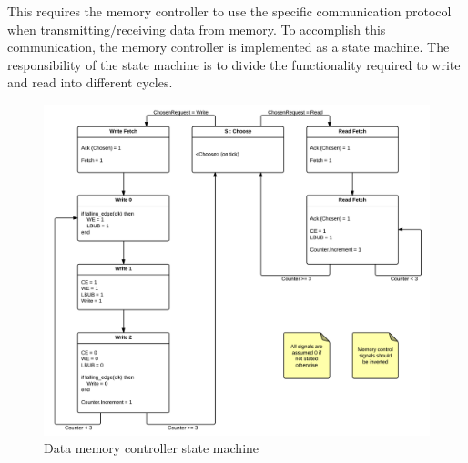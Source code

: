 This requires the memory controller to use the specific communication protocol when transmitting/receiving data from memory. To accomplish this communication, the memory controller is implemented as a state machine. The responsibility of the state machine is to divide the functionality required to write and read into different cycles.  



\begin{figure}

  \centering
  \includegraphics[width=\textwidth]{fpga/fig/memory_ctrl_state_machine.png}
  \caption{Data memory controller state machine}
  \label{fpga:fig:mem:data_memory_ctrl}
\end{figure}



 








